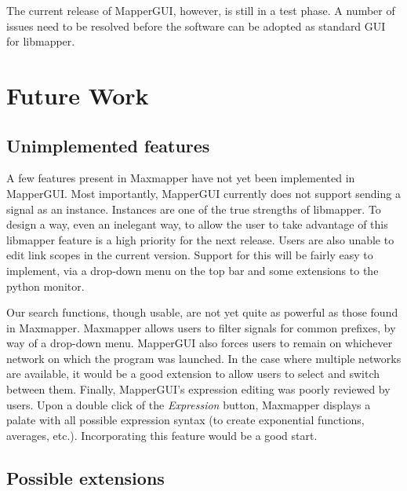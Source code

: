 The current release of MapperGUI, however, is still in a test phase. A number of issues need to be resolved before the software can be adopted as standard GUI for libmapper. 

\section{Future Work}
\label{sec:future_work}

	\subsection{Unimplemented features}

A few features present in Maxmapper have not yet been implemented in MapperGUI. Most importantly, MapperGUI currently does not support sending a signal as an instance. Instances are one of the true strengths of libmapper. To design a way, even an inelegant way, to allow the user to take advantage of this libmapper feature is a high priority for the next release. Users are also unable to edit link scopes in the current version. Support for this will be fairly easy to implement, via a drop-down menu on the top bar and some extensions to the python monitor. 

Our search functions, though usable, are not yet quite as powerful as those found in Maxmapper. Maxmapper allows users to filter signals for common prefixes, by way of a drop-down menu.  MapperGUI also forces users to remain on whichever network on which the program was launched. In the case where multiple networks are available, it would be a good extension to allow users to select and switch between them. Finally, MapperGUI's expression editing was poorly reviewed by users. Upon a double click of the \emph{Expression} button, Maxmapper displays a palate with all possible expression syntax (to create exponential functions, averages, etc.). Incorporating this feature would be a good start.


	\subsection{Possible extensions} %
	\label{sub:possible_extensions}

